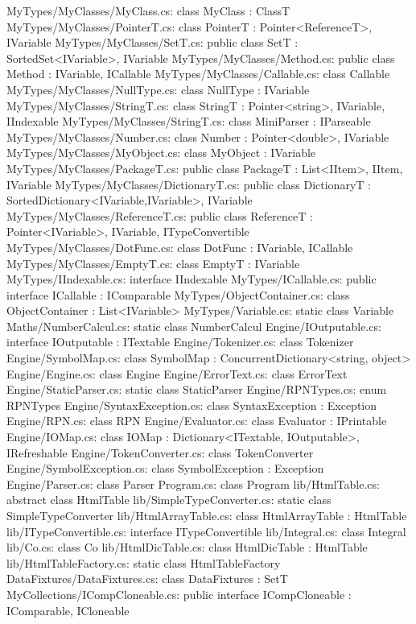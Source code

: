 MyTypes/MyClasses/MyClass.cs:	class MyClass : ClassT 
MyTypes/MyClasses/PointerT.cs:	class PointerT : Pointer<ReferenceT>, IVariable 
MyTypes/MyClasses/SetT.cs:	public class SetT : SortedSet<IVariable>, IVariable 
MyTypes/MyClasses/Method.cs:	public class Method : IVariable, ICallable 
MyTypes/MyClasses/Callable.cs:	class Callable 
MyTypes/MyClasses/NullType.cs:	class NullType : IVariable 
MyTypes/MyClasses/StringT.cs:	class StringT : Pointer<string>, IVariable, IIndexable 
MyTypes/MyClasses/StringT.cs:		class MiniParser : IParseable 
MyTypes/MyClasses/Number.cs:	class Number : Pointer<double>, IVariable 
MyTypes/MyClasses/MyObject.cs:	class MyObject : IVariable 
MyTypes/MyClasses/PackageT.cs:	public class PackageT : List<IItem>, IItem, IVariable 
MyTypes/MyClasses/DictionaryT.cs:	public class DictionaryT : SortedDictionary<IVariable,IVariable>, IVariable 
MyTypes/MyClasses/ReferenceT.cs:	public class ReferenceT : Pointer<IVariable>, IVariable, ITypeConvertible 
MyTypes/MyClasses/DotFunc.cs:	class DotFunc : IVariable, ICallable  
MyTypes/MyClasses/EmptyT.cs:	class EmptyT : IVariable 
MyTypes/IIndexable.cs:	interface IIndexable 
MyTypes/ICallable.cs:	public interface ICallable : IComparable 
MyTypes/ObjectContainer.cs:	class ObjectContainer : List<IVariable> 
MyTypes/Variable.cs:	static class Variable 
Maths/NumberCalcul.cs:	static class NumberCalcul 
Engine/IOutputable.cs:	interface IOutputable : ITextable 
Engine/Tokenizer.cs:	class Tokenizer 
Engine/SymbolMap.cs:	class SymbolMap : ConcurrentDictionary<string, object> 
Engine/Engine.cs:	class Engine 
Engine/ErrorText.cs:	class ErrorText 
Engine/StaticParser.cs:	static class StaticParser 
Engine/RPNTypes.cs:	enum RPNTypes 
Engine/SyntaxException.cs:	class SyntaxException : Exception 
Engine/RPN.cs:	class RPN 
Engine/Evaluator.cs:	class Evaluator : IPrintable 
Engine/IOMap.cs:	class IOMap : Dictionary<ITextable, IOutputable>, IRefreshable 
Engine/TokenConverter.cs:	class TokenConverter 
Engine/SymbolException.cs:	class SymbolException : Exception 
Engine/Parser.cs:	class Parser 
Program.cs:	class Program 
lib/HtmlTable.cs:	abstract class HtmlTable 
lib/SimpleTypeConverter.cs:	static class SimpleTypeConverter 
lib/HtmlArrayTable.cs:	class HtmlArrayTable : HtmlTable 
lib/ITypeConvertible.cs:	interface ITypeConvertible 
lib/Integral.cs:	class Integral 
lib/Co.cs:	class Co 
lib/HtmlDicTable.cs:	class HtmlDicTable : HtmlTable 
lib/HtmlTableFactory.cs:	static class HtmlTableFactory 
DataFixtures/DataFixtures.cs:	class DataFixtures : SetT 
MyCollections/ICompCloneable.cs:	public interface ICompCloneable : IComparable, ICloneable 
